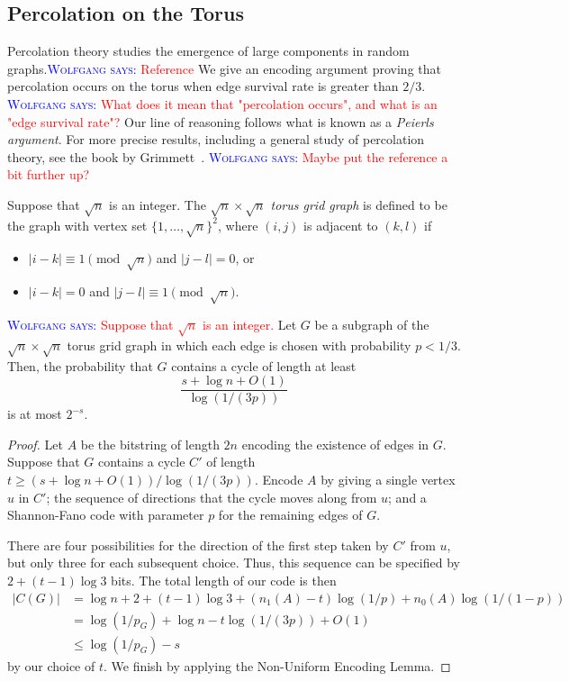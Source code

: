\documentclass{patmorin}
\newcommand{\aremark}[3]{\textcolor{blue}{\textsc{#1 #2:}}
  \textcolor{red}{\textsf{#3}}}
\newcommand{\wolfgang}[2][says]{\aremark{Wolfgang}{#1}{#2}}
\begin{document}
\subsection{Percolation on the Torus}

Percolation theory studies the emergence of large components in random
graphs.\wolfgang{Reference}
We give an encoding argument proving that percolation occurs
on the torus when edge survival rate is greater than $2/3$. 
\wolfgang{What does it mean that "percolation occurs", and 
what is an "edge survival rate"?}
Our line
of reasoning follows what is known as a \emph{Peierls argument}. For
more precise results, including a general study of percolation theory,
see the book by Grimmett~\cite{grimmett:percolation}.
\wolfgang{Maybe put the reference a bit further up?}

Suppose that $\sqrt{n}$ is an integer. The \emph{$\sqrt{n} \times \sqrt{n}$
  torus grid graph} is defined to be the graph with vertex set
$\{1, \ldots, \sqrt{n}\}^2$, where $(i, j)$ is adjacent to $(k, l)$
if
\begin{itemize}[topsep=0pt]
\item $|i - k| \equiv 1 \pmod{\sqrt{n}}$ and $|j - l| = 0$, or
\item $|i - k| = 0$ and $|j - l| \equiv 1 \pmod{\sqrt{n}}$.
\end{itemize}

\begin{thm}
\wolfgang{Suppose that $\sqrt{n}$ is an integer.}
  Let $G$ be a subgraph of the $\sqrt{n} \times \sqrt{n}$ torus grid
  graph in which each edge is chosen with probability $p < 1/3$. Then,
  the probability that $G$ contains a cycle of length at least
  \[
    \frac{s + \log n + O(1)}{\log (1/(3p))}
  \]
  is at most $2^{-s}$.
\end{thm}
\begin{proof}
  Let $A$ be the bitstring of length $2n$ encoding the existence of
  edges in $G$. Suppose that $G$ contains a cycle $C'$ of length
  $t \geq (s + \log n + O(1))/\log (1/(3p))$. Encode $A$ by giving a
  single vertex $u$ in $C'$; the sequence of directions that the cycle
  moves along from $u$; and a Shannon-Fano code with parameter $p$ for
  the remaining edges of $G$.

  There are four possibilities for the direction of the
  first step taken by $C'$ from $u$, but only three for each
  subsequent choice. Thus, this sequence can be specified by
  $2 + (t - 1) \log 3$ bits. The total length of our code is then
  \begin{align*}
    |C(G)| &= \log n + 2 + (t - 1) \log 3 + (n_1(A) - t) \log (1/p) +
             n_0(A) \log (1/(1 - p)) \\
           &= \log (1/p_G) + \log n - t \log (1/(3p)) + O(1) \\
           &\leq \log (1/p_G) - s
  \end{align*}
  by our choice of $t$. We finish by applying the Non-Uniform Encoding
  Lemma.
\end{proof}
\end{document}

